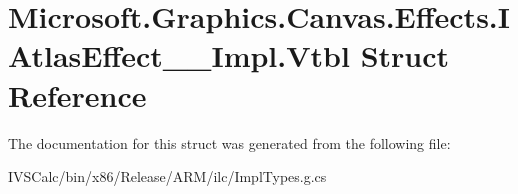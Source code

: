 \hypertarget{struct_microsoft_1_1_graphics_1_1_canvas_1_1_effects_1_1_i_atlas_effect_____impl_1_1_vtbl}{}\section{Microsoft.\+Graphics.\+Canvas.\+Effects.\+I\+Atlas\+Effect\+\_\+\+\_\+\+Impl.\+Vtbl Struct Reference}
\label{struct_microsoft_1_1_graphics_1_1_canvas_1_1_effects_1_1_i_atlas_effect_____impl_1_1_vtbl}


The documentation for this struct was generated from the following file\+:\begin{DoxyCompactItemize}
\item 
I\+V\+S\+Calc/bin/x86/\+Release/\+A\+R\+M/ilc/Impl\+Types.\+g.\+cs\end{DoxyCompactItemize}
